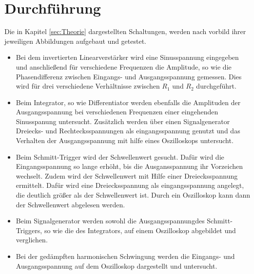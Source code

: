 
\section{Durchführung}
\label{sec:Durchführung}
Die in Kapitel \ref{sec:Theorie} dargestellten Schaltungen, werden nach vorbild ihrer jeweiligen Abbildungen aufgebaut und getestet.

\begin{itemize}
    \item Bei dem invertierten Linearverstärker wird eine Sinusspannung eingegeben und anschließend für verschiedene Frequenzen die Amplitude, so wie die Phasendifferenz zwischen Eingangs- und Ausgangsspannung gemessen.
        Dies wird für drei verschiedene Verhältnisse zwischen $R_1$ und $R_2$ durchgeführt.

    \item Beim Integrator, so wie Differentiator werden ebenfalls die Amplituden der Ausgangsspannung bei verschiedenen Frequenzen einer eingehenden Sinusspanung untersucht.
        Zusätzlich werden über einen Signalgenerator Dreiecks- und Rechtecksspannungen als eingangsspannung genutzt und das Verhalten der Ausgangsspannung mit hilfe eines Oszilloskops untersucht.

    \item Beim Schmitt-Trigger wird der Schwellenwert gesucht. Dafür wird die Eingangsspannung so lange erhöht, bis die Ausgansspannung ihr Vorzeichen wechselt.
        Zudem wird der Schwellenwert mit Hilfe einer Dreiecksspannung ermittelt. Dafür wird eine Dreiecksspannung als eingangsspannung angelegt, die deutlich größer als der Schwellenwert ist.
    	Durch ein Oszilloskop kann dann der Schwellenwert abgelesen werden.

    \item Beim Signalgenerator werden sowohl die Ausgangsspannungdes Schmitt-Triggers, so wie die des Integrators, auf einem Oszilloskop abgebildet und verglichen.

    \item Bei der gedämpften harmonischen Schwingung werden die Eingangs- und Ausgangsspannung auf dem Oszilloskop dargestellt und untersucht.

\end{itemize}
